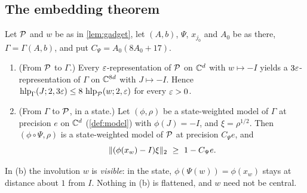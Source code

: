 \subsection{The embedding theorem}\label{gadget:theorem}

\begin{theorem}\label{thm:embedding}
Let $\mathcal P$ and $w$ be as in \cref{lem:gadget}, let $(A,b)$, $\Psi$, $x_{j_0}$ and $A_0$ be as there, $\Gamma=\Gamma(A,b)$, and put
$C_\Psi=A_0(8A_0+17)$.
\begin{enumerate}[label=(\alph*),itemsep=1pt]
\item (From $\mathcal P$ to $\Gamma$.) Every $\varepsilon$-representation of $\mathcal P$ on $\mathbb C^d$ with $w\mapsto-I$ yields a $3\varepsilon$-representation of
$\Gamma$ on $\mathbb C^{8d}$ with $J\mapsto-I$. Hence $\operatorname{hlp}_\Gamma(J;2,3\varepsilon)\le8\,\operatorname{hlp}_\mathcal P(w;2,\varepsilon)$ for every $\varepsilon>0$.
\item (From $\Gamma$ to $\mathcal P$, in a state.) Let $(\phi,\rho)$ be a state-weighted model of $\Gamma$ at precision $e$ on $\mathbb C^d$
(\cref{def:model}) with $\phi(J)=-I$, and $\xi=\rho^{1/2}$. Then $(\phi\circ\Psi,\rho)$ is a state-weighted model of $\mathcal P$ at precision
$C_\Psi e$, and
\[
\lVert (\phi(x_w)-I)\xi\rVert_2\ \ge\ 1-C_\Psi e .
\]
\end{enumerate}
\end{theorem}

In (b) the involution $w$ is \emph{visible}: in the state, $\phi(\Psi(w))=\phi(x_w)$ stays at distance about $1$ from $I$. Nothing in (b) is
flattened, and $w$ need not be central.


